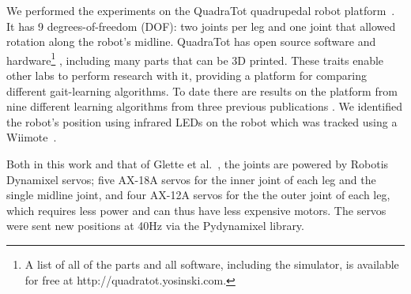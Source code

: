 
We performed the experiments on the QuadraTot quadrupedal robot platform~\cite{yos:clune}.
It has 9 degrees-of-freedom (DOF): two joints per leg and one joint that allowed rotation along the robot's midline. %
QuadraTot has open source software and hardware\footnote{A list of all of the parts and all software, including the simulator, is available for free at http://quadratot.yosinski.com.} %
, including many parts that can be 3D printed. These traits enable other labs to perform research with it, providing a platform for comparing different gait-learning algorithms. 
To date there are results on the platform from nine different learning algorithms from three previous publications \cite{yos:clune,glette,haocheng}. We identified the robot's position using infrared LEDs on the robot which was tracked using a Wiimote~\cite{yos:clune}.

Both in this work and that of Glette et al.~\cite{glette}, the joints are powered by Robotis Dynamixel servos; five AX-18A servos for the inner joint of each leg and the single midline joint, and four AX-12A servos for the the outer joint of each leg, which requires less power and can thus have less expensive motors. The servos were sent new positions at 40Hz via the Pydynamixel library. 

